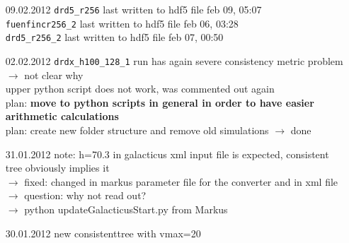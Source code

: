 \documentclass[a4paper,11pt,fleqn,oneside]{book}
\begin{document}
\begin{itemize}
\item[09.02.2012]
\texttt{drd5\_r256} last written to hdf5 file feb 09, 05:07 \\
\texttt{fuenfincr256\_2} last written to hdf5 file feb 06, 03:28 \\
\texttt{drd5\_r256\_2} last written to hdf5 file feb 07, 00:50 \\

\item[02.02.2012]
\texttt{drdx\_h100\_128\_1} run has again severe consistency 
metric problem \\ $\rightarrow$ not clear why \\
upper python script does not work, was commented out again \\
plan: \textbf{move to python scripts in general in order to have
 easier arithmetic calculations} \\   
plan: create new folder structure and remove old simulations $\rightarrow$ done \\

\item[31.01.2012]
note: h=70.3 in galacticus xml input file is expected, consistent tree obviously implies it \\
$\rightarrow$ fixed: changed in markus parameter file for the converter and in xml file \\
$\rightarrow$ question: why not read out? \\
$\rightarrow$ python updateGalacticusStart.py from Markus 

\item[30.01.2012]
new consistenttree with vmax=20

\end{itemize}
\end{document}
